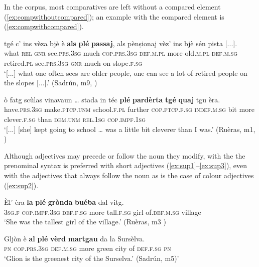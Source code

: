 In the corpus, most comparatives are left without a compared element (\ref{ex:compwithoutcompared}); an example with the compared element is (\ref{ex:compwithcompared}).

\ea
\label{ex:compwithoutcompared}
\gll [...] tgé c’ ins vèza bjè è \textbf{als} \textbf{plé} \textbf{passaj}, als pènṣionaj vèz’ ins bjè sén pista [...].\\
{} what \textsc{rel} \textsc{gnr} see.\textsc{prs.3sg} much \textsc{cop.prs.3sg} \textsc{def.m.pl} more old.\textsc{m.pl} \textsc{def.m.sg} retired.\textsc{pl} see.\textsc{prs.3sg} \textsc{gnr} much on slope.\textsc{f.sg}\\
\glt `[...] what one often sees are older people, one can see a lot of retired people on the slopes [...].' (Sadrún, m9, )
\z

\ea
\label{ex:compwithcompared}
\gll    [...] ò fatg scùlas vinavaun … stada in téc \textbf{plé} \textbf{pardèrta} \textbf{tgé} \textbf{quaj} tgu èra.\\
{} have.\textsc{prs.3sg} make.\textsc{ptcp.unm} school.\textsc{f.pl} further {} \textsc{cop.ptcp.f.sg} \textsc{indef.m.sg} bit more  clever.\textsc{f.sg} than \textsc{dem.unm} \textsc{rel.1sg} \textsc{cop.impf.1sg} \\
\glt `[...] [she] kept going to school … was a little bit cleverer than I was.' (Ruèras, m1, )
\z

Although adjectives may precede or follow the noun they modify, with the  the prenominal syntax is preferred with short adjectives (\ref{ex:sup1}--\ref{ex:sup3}), even with the adjectives that always follow the noun as is the case of colour adjectives (\ref{ex:sup2}).

\ea
\label{ex:sup1}
\gll Èl’ èra \textbf{la} \textbf{plé} \textbf{grònda} \textbf{buéba} dal vitg.  \\
\textsc{3sg.f} \textsc{cop.impf.3sg} \textsc{def.f.sg} more tall.\textsc{f.sg} girl of.\textsc{def.m.sg} village	\\
\glt `She was the tallest girl of the village.' (Ruèras, m3 )
\z

\ea
\label{ex:sup2}
\gll Gljòn è \textbf{al} \textbf{plé} \textbf{vèrd} \textbf{martgau} da la Sursèlva.\\
\textsc{pn} \textsc{cop.prs.3sg} \textsc{def.m.sg} more green city of \textsc{def.f.sg} \textsc{pn}\\
\glt `Glion is the greenest city of the Surselva.' (Sadrún, m5)'
\z

